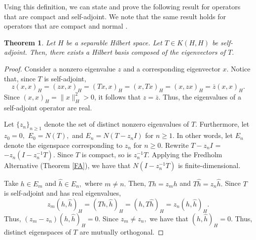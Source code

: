 \documentclass[12pt,a4paper]{article}
\theoremstyle{boldthm}
\newtheorem{theorem}{Theorem}[section]
\theoremstyle{bolddefn}
\begin{document}
Using this definition, we can state and prove the following result for operators that are compact and self-adjoint. We note that the same result holds for operators that are compact and normal \cite{umberto}.

\begin{theorem} \label{HB}
    Let $H$ be a separable Hilbert space. Let $T \in K(H, H)$ be self-adjoint. Then, there exists a Hilbert basis composed of the eigenvectors of $T.$
\end{theorem}

\begin{proof}
 Consider a nonzero eigenvalue $z$ and a corresponding eigenvector $x.$ Notice that, since $T$ is self-adjoint,
    \begin{equation} 
        z(x,x)_H
    =
    (z x,x)_H
    =
    (Tx,x)_H
    =
    (x,Tx)_H
    =
    (x,z x)_H
    =
    \overline{z}(x,x)_H.
    \end{equation}
Since $(x,x)_H=\|x\|_H^2>0$, it follows that $z = \overline z.$ Thus, the eigenvalues of a self-adjoint operator are real.

    Let $\{z_n\}_{n\ge1}$ denote the set of distinct nonzero eigenvalues of $T.$ Furthermore,
    let $z_0 = 0,$ $E_0 = N(T),$ and $E_n = N(T-z_nI)$ for $n \ge 1.$ In other words, let $E_n$ denote the eigenspace corresponding to $z_n$ for $n \ge 0.$ Rewrite $T-z_n I$ = $-z_n ( I - z_n^{-1} T).$ Since $T$ is compact, so is $z_n^{-1} T.$ Applying the Fredholm Alternative (Theorem \ref{FA}), we have that $N(I - z_n^{-1} T)$ is finite-dimensional. 

    Take $h \in E_m$ and $\hat h \in E_n,$ where $m \ne n.$ Then, $Th = z_m h$ and $T\hat h = z_n \hat h.$ Since $T$ is self-adjoint and has real eigenvalues, 
    \begin{equation}
        z_m(h, \hat h)_H = (Th, \hat h)_H = (h, T\hat h)_H = z_n (h, \hat h)_H.
    \end{equation}
    Thus, $(z_m - z_n) (h, \hat h)_H = 0.$ Since $z_m \ne z_n,$ we have that $(h, \hat h)_H = 0.$ Thus, distinct eigenspaces of $T$ are mutually orthogonal. 


\end{proof}
\end{document}
